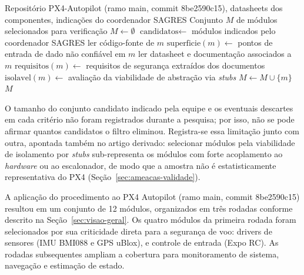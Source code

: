 \begin{algorithm}[H]
\caption{Procedimento de seleção de módulos críticos do PX4}
\label{alg:selecao}
\begin{algorithmic}[1]
\Require Repositório PX4-Autopilot (ramo main, commit 8be2590c15), datasheets dos componentes, indicações do coordenador SAGRES
\Ensure Conjunto $M$ de módulos selecionados para verificação
\State $M \gets \emptyset$
\State $\text{candidatos} \gets$ módulos indicados pelo coordenador SAGRES
    \State ler código-fonte de $m$ 
    \State $\text{superficie}(m) \gets$ pontos de entrada de dado não confiável em $m$
    \State ler datasheet e documentação associados a $m$
    \State $\text{requisitos}(m) \gets$ requisitos de segurança extraídos dos documentos
    \State $\text{isolavel}(m) \gets$ avaliação da viabilidade de abstração via \textit{stubs}
        \State $M \gets M \cup \{m\}$
    \EndIf
\EndFor
\State \Return $M$
\end{algorithmic}
\end{algorithm}

O tamanho do conjunto candidato indicado pela equipe e os eventuais
descartes em cada critério não foram registrados durante a pesquisa; por isso,
não se pode afirmar quantos candidatos o filtro eliminou. Registra-se essa
limitação junto com outra, apontada também no artigo derivado: selecionar
módulos pela viabilidade de isolamento por \textit{stubs} sub-representa os
módulos com forte acoplamento ao \textit{hardware} ou ao escalonador, de modo
que a amostra não é estatisticamente representativa do PX4
(Seção~\ref{sec:ameacas-validade}).


A aplicação do procedimento ao PX4 Autopilot (ramo main, commit 8be2590c15) resultou em um conjunto de 12 módulos, organizados em três rodadas conforme descrito na Seção~\ref{sec:visao-geral}. Os quatro módulos da primeira rodada foram selecionados por sua criticidade direta para a segurança de voo: drivers de sensores (IMU BMI088 e GPS uBlox),  e controle de entrada (Expo RC). As rodadas subsequentes ampliam a cobertura para monitoramento de sistema, navegação e estimação de estado.

